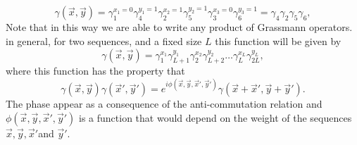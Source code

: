 \begin{equation}
\gamma(\vec{x},\vec{y}) = \gamma_1^{x_1=0} \gamma_{4}^{y_1=1} \gamma_{2}^{x_2=1} \gamma_{5}^{y_2=1} \gamma_{3}^{x_3=0} \gamma_{6}^{y_3=1} = \gamma_{4}\gamma_{2}\gamma_{5}\gamma_{6},
\end{equation}
Note that in this way we are able to write any product of Grassmann operators. in general, for two sequences, and a fixed size $L$ this function will be given by
\begin{equation}
\gamma(\vec{x},\vec{y}) = \gamma_1^{x_1} \gamma_{L+1}^{y_1} \gamma_{2}^{x_2} \gamma_{L+2}^{y_2}\ldots \gamma_{L}^{x_L} \gamma_{2L}^{y_L},
\end{equation} 
where this function has the property that
\begin{equation}
\gamma(\vec{x},\vec{y})\gamma(\vec{x}',\vec{y}') = e^{i\phi(\vec{x},\vec{y},\vec{x}',\vec{y}')} \gamma(\vec{x}+\vec{x}',\vec{y}+\vec{y}').
\label{CH2:my_relation_delta}
\end{equation}
The phase appear as a consequence of the anti-commutation relation and $\phi(\vec{x},\vec{y},\vec{x}',\vec{y}')$ is a function that would depend on the weight of the sequences $\vec{x},\vec{y},\vec{x}'$and $\vec{y}'$.\\

